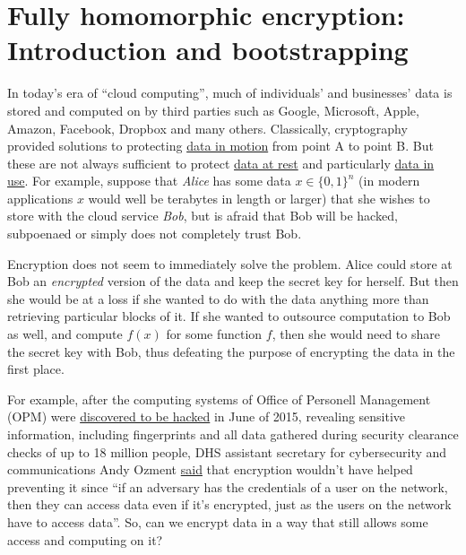 \chapter{Fully homomorphic encryption: Introduction and
bootstrapping}\label{chapfheone}

In today's era of ``cloud computing'', much of individuals' and
businesses' data is stored and computed on by third parties such as
Google, Microsoft, Apple, Amazon, Facebook, Dropbox and many others.
Classically, cryptography provided solutions to protecting
\href{https://www.schneier.com/blog/archives/2010/06/data_at_rest_vs.html}{data
in motion} from point A to point B. But these are not always sufficient
to protect \href{https://en.wikipedia.org/wiki/Data_at_rest}{data at
rest} and particularly
\href{https://en.wikipedia.org/wiki/Data_in_use}{data in use}. For
example, suppose that \emph{Alice} has some data \(x \in \{0,1\}^n\) (in
modern applications \(x\) would well be terabytes in length or larger)
that she wishes to store with the cloud service \emph{Bob}, but is
afraid that Bob will be hacked, subpoenaed or simply does not completely
trust Bob.

Encryption does not seem to immediately solve the problem. Alice could
store at Bob an \emph{encrypted} version of the data and keep the secret
key for herself. But then she would be at a loss if she wanted to do
with the data anything more than retrieving particular blocks of it. If
she wanted to outsource computation to Bob as well, and compute \(f(x)\)
for some function \(f\), then she would need to share the secret key
with Bob, thus defeating the purpose of encrypting the data in the first
place.

For example, after the computing systems of Office of Personell
Management (OPM) were
\href{https://www.lawfareblog.com/why-opm-hack-far-worse-you-imagine}{discovered
to be hacked} in June of 2015, revealing sensitive information,
including fingerprints and all data gathered during security clearance
checks of up to 18 million people, DHS assistant secretary for
cybersecurity and communications Andy Ozment
\href{http://www.federaltimes.com/story/government/omr/opm-cyber-report/2015/06/19/opm-breach-encryption/28985237/}{said}
that encryption wouldn't have helped preventing it since ``if an
adversary has the credentials of a user on the network, then they can
access data even if it's encrypted, just as the users on the network
have to access data''. So, can we encrypt data in a way that still
allows some access and computing on it?

